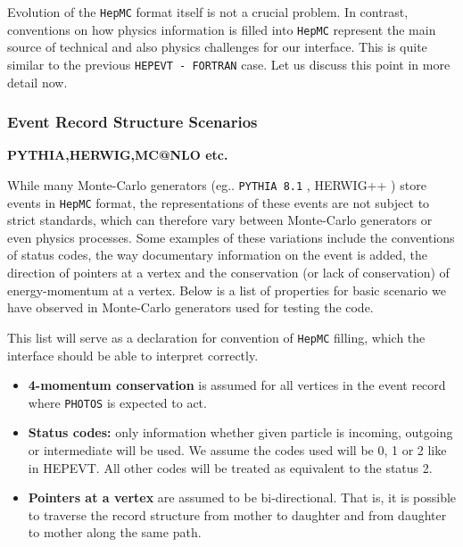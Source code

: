 \documentclass[]{Photos_interface_design}
\begin{document}
Evolution of the {\tt HepMC} format itself is not a crucial problem.
In contrast, conventions on how physics information is  filled into {\tt HepMC}
represent the main source of technical and also physics 
challenges for our interface. 
This is quite similar to the previous
{\tt HEPEVT - FORTRAN} case. Let us discuss this point in more detail now.

\subsubsection{Event Record Structure Scenarios}

{\bf PYTHIA,HERWIG,MC@NLO etc. }

While many Monte-Carlo generators (eg.. {\tt PYTHIA 8.1} \cite{Sjostrand:2007gs}, 
HERWIG++ \cite{Bahr:2008pv})
store events in {\tt HepMC} format, the  representations of
these events are not subject to strict standards,  which can therefore
vary between Monte-Carlo generators or even physics processes. Some examples
of these variations include the conventions of status codes, the  way
documentary information on the event is added, the direction of pointers at a vertex
and the conservation (or lack of conservation) of energy-momentum at a vertex.
Below is a list of properties for basic scenario we have observed in Monte-Carlo
generators used for testing the code.

This list will serve as a declaration for convention of  {\tt HepMC} filling, which  the 
interface should  be able to interpret correctly.

\begin{itemize}
  \item \textbf{4-momentum conservation} is assumed for all vertices in the event record where {\tt PHOTOS} is expected to act.
  \item \textbf{Status codes:} only information whether given particle is incoming, outgoing or intermediate will be used. We assume the codes used will be 0, 1 or 2 like in HEPEVT. All other codes will be treated as
equivalent to  the status 2.
  \item \textbf{Pointers at a vertex} are assumed to be bi-directional. That is, it is possible to traverse the record structure from mother to daughter and from daughter to mother along the same path.
\end{itemize}
\end{document}
